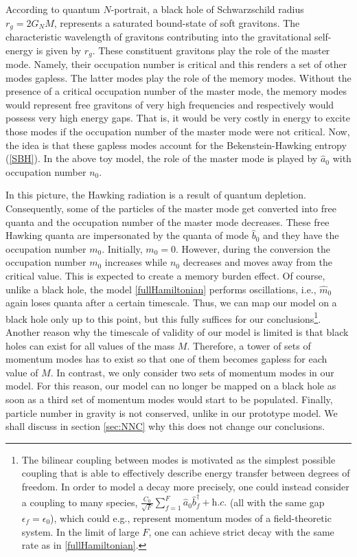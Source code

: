 \documentclass[aps,prd,reprint,superscriptaddress,nofootinbib]{revtex4-2}
\begin{document}
 According to quantum $N$-portrait,  a black hole of 
Schwarzschild radius $r_g =2 G_N M$,   represents a saturated bound-state of soft gravitons. The 
characteristic wavelength of gravitons contributing into the gravitational self-energy is given by  $r_g$.  These constituent gravitons play the role of
the master mode. Namely, their occupation number is critical and this 
renders a set of other modes gapless. The latter modes play the role
of the memory modes. Without the presence of a critical occupation number 
of the master mode, the memory modes would represent free gravitons 
 of very high frequencies and respectively would possess very high energy 
gaps.
 That is, it would be very costly in energy to excite those modes 
if the  occupation number of the master mode were not critical.  
   Now, the idea is that these gapless  modes account for the Bekenstein-Hawking entropy (\ref{SBH}).  
In the above toy model, the role of the master mode is 
played by $\hat{a}_0$ with occupation number $n_0$.  

In this picture, the Hawking radiation \cite{Hawking} is a result of quantum depletion. Consequently, some of the particles of the master mode get 
converted into free quanta and the occupation number of the master mode decreases.  
 These free Hawking quanta are impersonated by 
the quanta  of mode $\hat{b}_0$ and they have the occupation number $m_0$.  Initially, $m_0=0$.  However, during the conversion the occupation 
number $m_0$ increases while 
$n_0$ decreases and moves away from the critical value. 
This is expected to create a memory burden effect. Of course, unlike a black hole, the model \eqref{fullHamiltonian} performs oscillations, i.e., $\hat{m}_0$ again loses quanta after a certain timescale. Thus, we can map our model on a black hole only up to this point, but this fully suffices for our conclusions\footnote
{The bilinear coupling between modes is motivated as the simplest possible coupling that is able to effectively describe energy transfer between degrees of freedom.
In order to model a decay more precisely, one could instead consider a coupling to many species, $\frac{C_0}{\sqrt{F}}\sum_{f=1}^{F}\hat{a}_0 \hat{b}^{\dagger}_f + \textit{h.c.}$ (all with the same gap $\epsilon_f = 
\epsilon_0$), which could e.g., represent momentum modes of a field-theoretic system. 
In the limit of large $F$, one can achieve strict decay with the same rate as in \eqref{fullHamiltonian}.
}.
Another reason why the timescale of validity of our model is limited is that black holes can exist for all values of the mass $M$. Therefore, a tower of sets of momentum modes has to exist so that one of them becomes gapless for each value of $M$. In contrast, we only consider two sets of momentum modes in our model. For this reason, our model can no longer be mapped on a black hole as soon as a third set of momentum modes would start 
to be populated.
Finally, particle number in gravity is not conserved, unlike in our prototype model. We shall discuss in section \ref{sec:NNC} why this does not change our conclusions. 
\end{document}
